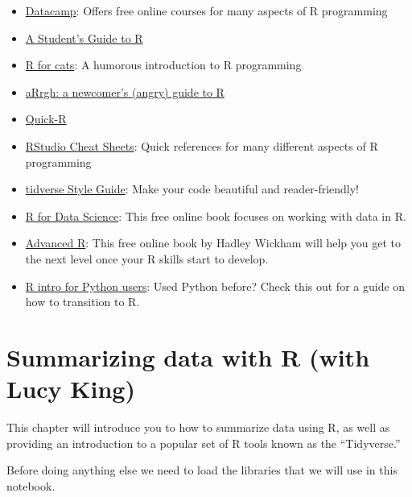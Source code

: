 \documentclass[12pt,]{book}
\newenvironment{Shaded}{\begin{snugshade}}{\end{snugshade}}
\newcommand{\DataTypeTok}[1]{\textcolor[rgb]{0.13,0.29,0.53}{#1}}
\newcommand{\DecValTok}[1]{\textcolor[rgb]{0.00,0.00,0.81}{#1}}
\newcommand{\KeywordTok}[1]{\textcolor[rgb]{0.13,0.29,0.53}{\textbf{#1}}}
\newcommand{\NormalTok}[1]{#1}
\newcommand{\OperatorTok}[1]{\textcolor[rgb]{0.81,0.36,0.00}{\textbf{#1}}}
\providecommand{\tightlist}{%
  \setlength{\itemsep}{0pt}\setlength{\parskip}{0pt}}
\begin{document}
\begin{itemize}
\tightlist
\item
  \href{https://www.datacamp.com/}{Datacamp}: Offers free online courses for many aspects of R programming
\item
  \href{https://cran.r-project.org/doc/contrib/Horton+Pruim+Kaplan_MOSAIC-StudentGuide.pdf}{A Student's Guide to R}
\item
  \href{https://rforcats.net/}{R for cats}: A humorous introduction to R programming
\item
  \href{http://arrgh.tim-smith.us/}{aRrgh: a newcomer's (angry) guide to R}
\item
  \href{http://www.statmethods.net/index.html}{Quick-R}
\item
  \href{https://www.rstudio.com/resources/cheatsheets/}{RStudio Cheat Sheets}: Quick references for many different aspects of R programming
\item
  \href{https://style.tidyverse.org/}{tidverse Style Guide}: Make your code beautiful and reader-friendly!
\item
  \href{http://r4ds.had.co.nz/index.html}{R for Data Science}: This free online book focuses on working with data in R.
\item
  \href{http://adv-r.had.co.nz/}{Advanced R}: This free online book by Hadley Wickham will help you get to the next level once your R skills start to develop.
\item
  \href{http://ramnathv.github.io/pycon2014-r/}{R intro for Python users}: Used Python before? Check this out for a guide on how to transition to R.
\end{itemize}

\hypertarget{summarizing-data-with-r-with-lucy-king}{%
\chapter{Summarizing data with R (with Lucy King)}\label{summarizing-data-with-r-with-lucy-king}}

This chapter will introduce you to how to summarize data using R, as well as providing an introduction to a popular set of R tools known as the ``Tidyverse.''

Before doing anything else we need to load the libraries that we will use in this notebook.

\begin{Shaded}
\end{Shaded}
\end{document}
